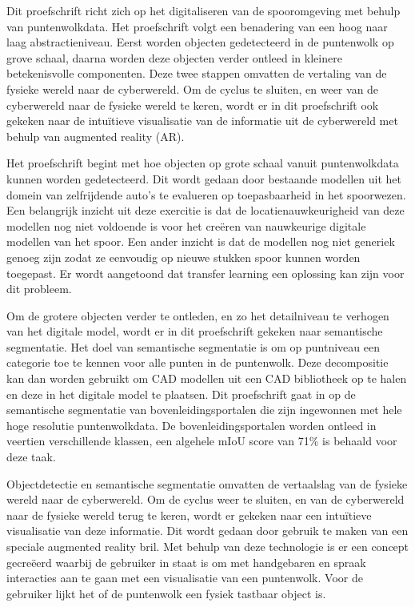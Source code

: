 Dit proefschrift richt zich op het digitaliseren van de spooromgeving met behulp van puntenwolkdata. Het proefschrift volgt een benadering van een hoog naar laag abstractieniveau. Eerst worden objecten gedetecteerd in de puntenwolk op grove schaal, daarna worden deze objecten verder ontleed in kleinere betekenisvolle componenten. Deze twee stappen omvatten de vertaling van de fysieke wereld naar de cyberwereld. Om de cyclus te sluiten, en weer van de cyberwereld naar de fysieke wereld te keren, wordt er in dit proefschrift ook gekeken naar de intu\"{i}tieve visualisatie van de informatie uit de cyberwereld met behulp van augmented reality (AR).

Het proefschrift begint met hoe objecten op grote schaal vanuit puntenwolkdata kunnen worden gedetecteerd. Dit wordt gedaan door bestaande modellen uit het domein van zelfrijdende auto's te evalueren op toepasbaarheid in het spoorwezen. Een belangrijk inzicht uit deze exercitie is dat de locatienauwkeurigheid van deze modellen nog niet voldoende is voor het cre\"{e}ren van nauwkeurige digitale modellen van het spoor. Een ander inzicht is dat de modellen nog niet generiek genoeg zijn zodat ze eenvoudig op nieuwe stukken spoor kunnen worden toegepast. Er wordt aangetoond dat transfer learning een oplossing kan zijn voor dit probleem.

Om de grotere objecten verder te ontleden, en zo het detailniveau te verhogen van het digitale model, wordt er in dit proefschrift gekeken naar semantische segmentatie. Het doel van semantische segmentatie is om op puntniveau een categorie toe te kennen voor alle punten in de puntenwolk. Deze decompositie kan dan worden gebruikt om \textsc{CAD} modellen uit een \textsc{CAD} bibliotheek op te halen en deze in het digitale model te plaatsen. Dit proefschrift gaat in op de semantische segmentatie van bovenleidingsportalen die zijn ingewonnen met hele hoge resolutie puntenwolkdata. De bovenleidingsportalen worden ontleed in veertien verschillende klassen, een algehele mIoU score van 71\% is behaald voor deze taak.

Objectdetectie en semantische segmentatie omvatten de vertaalslag van de fysieke wereld naar de cyberwereld. Om de cyclus weer te sluiten, en van de cyberwereld naar de fysieke wereld terug te keren, wordt er gekeken naar een intu\"{i}tieve visualisatie van deze informatie. Dit wordt gedaan door gebruik te maken van een speciale augmented reality bril. Met behulp van deze technologie is er een concept gecre\"{e}erd waarbij de gebruiker in staat is om met handgebaren en spraak interacties aan te gaan met een visualisatie van een puntenwolk. Voor de gebruiker lijkt het of de puntenwolk een fysiek tastbaar object is.

